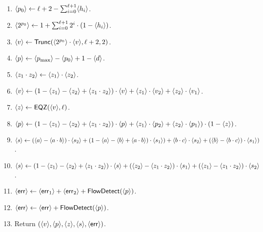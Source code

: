 \begin{enumerate}
    \item $\langle p_0 \rangle \leftarrow \ell+2-\sum_{i=0}^{\ell+1} \langle h_i \rangle$.
    \item $\langle 2^{p_0} \rangle \leftarrow 1+ \sum_{i=0}^{\ell+1} 2^i \cdot (1-\langle h_i \rangle)$.
    \item $\langle v \rangle \leftarrow \mathsf{Trunc}(\langle 2^{p_0} \rangle \cdot \langle v \rangle,\ell+2,2)$.
    \item $\langle p \rangle \leftarrow \langle p_{\max} \rangle-\langle p_0 \rangle+1-\langle d \rangle$.
    \item $\langle z_1 \cdot z_2 \rangle \leftarrow \langle z_1 \rangle \cdot \langle z_2 \rangle$.
    \item $\langle v \rangle \leftarrow (1-\langle z_1 \rangle-\langle z_2 \rangle +\langle z_1 \cdot z_2 \rangle) \cdot \langle v \rangle
            + \langle z_1 \rangle \cdot \langle v_2 \rangle + \langle z_2 \rangle \cdot \langle v_1 \rangle$.
    \item $\langle z \rangle \leftarrow \mathsf{EQZ}(\langle v \rangle,\ell)$.
    \item $\langle p \rangle \leftarrow (1-\langle z_1 \rangle-\langle z_2 \rangle+\langle z_1 \cdot z_2 \rangle) \cdot \langle p \rangle
            + \langle z_1 \rangle \cdot \langle p_2 \rangle
            + \langle z_2 \rangle \cdot \langle p_1 \rangle) \cdot (1-\langle z \rangle)$.
    \item $\langle s \rangle \leftarrow (\langle a \rangle-\langle a \cdot b \rangle) \cdot \langle s_2 \rangle
            + (1-\langle a \rangle-\langle b \rangle+\langle a \cdot b \rangle) \cdot \langle s_1 \rangle)
            + \langle b \cdot c \rangle \cdot \langle s_2 \rangle
            + (\langle b \rangle-\langle b \cdot c \rangle) \cdot \langle s_1 \rangle)$.
    \item $\langle s \rangle \leftarrow (1-\langle z_1 \rangle-\langle z_2 \rangle+\langle z_1 \cdot z_2 \rangle) \cdot \langle s \rangle
            + (\langle z_2 \rangle-\langle z_1 \cdot z_2 \rangle) \cdot \langle s_1 \rangle
            + (\langle z_1 \rangle-\langle z_1 \cdot z_2 \rangle) \cdot \langle s_2 \rangle$.
    \item $\langle \mathsf{err} \rangle \leftarrow \langle \mathsf{err}_1 \rangle + \langle \mathsf{err}_2 \rangle + \mathsf{FlowDetect}(\langle p \rangle)$.
    \item $\langle \mathsf{err} \rangle \leftarrow \langle \mathsf{err} \rangle + \mathsf{FlowDetect}(\langle p \rangle)$.
    \item Return $(\langle v \rangle,\langle p \rangle,\langle z \rangle,\langle s \rangle,\langle \mathsf{err} \rangle)$.
  \end{enumerate}

